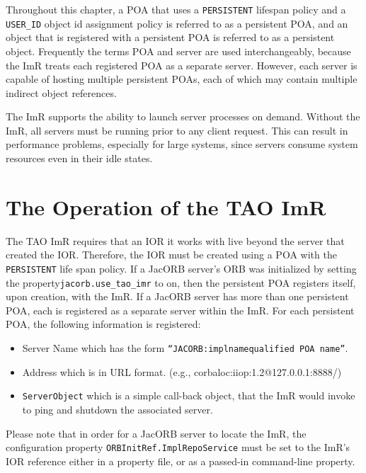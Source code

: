 Throughout this chapter, a POA that uses a {\tt PERSISTENT} lifespan 
policy and  a {\tt USER_ID} object id assignment policy is referred to as 
a persistent POA, and an object that is registered with a persistent POA is 
referred to as a persistent object.  Frequently the terms POA and server are 
used interchangeably, because the ImR treats each registered POA as a 
separate server. However, each server is capable of hosting multiple  
persistent POAs, each of which may contain multiple indirect object 
references.

The ImR supports the ability to launch server processes on demand. 
Without the ImR, all servers must be running prior to any client request. 
This can result in performance problems, especially for large systems, 
since servers consume system resources even in their idle states. 

\section{The Operation of the TAO ImR}

The TAO ImR requires that an IOR it works with live beyond the server 
that created the IOR. Therefore, the IOR must be created using a POA with 
the {\tt PERSISTENT} life span policy. If a JacORB server’s ORB was 
initialized by setting the property{\tt  jacorb.use\_tao\_imr} to on, then the  
persistent POA registers itself, upon creation, with the ImR.  If a JacORB 
server has more than one persistent POA, each is registered as a separate 
server within the ImR. For each persistent POA, the following information 
is registered: 

\begin{itemize}
     \item Server Name which has the form 
                {\tt``JACORB:implname\/qualified POA name”}.
     \item Address which is in URL format. 
              (e.g., corbaloc:iiop:1.2@127.0.0.1:8888/) 
     \item {\tt ServerObject} which is a simple call-back object, that the 
               ImR would invoke to ping and shutdown the associated server.
\end{itemize}

Please note that in order for a JacORB server to locate the ImR,  
the configuration property {\tt ORBInitRef.ImplRepoService} must be set to 
the ImR's IOR reference  either in a property file, or as a passed-in 
command-line property.

